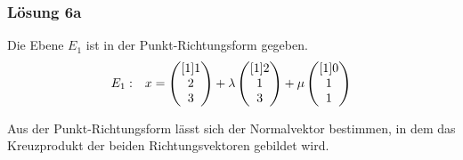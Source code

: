 \subsubsection{Lösung 6a}

Die Ebene $\displaystyle E_{1}$ ist in der Punkt-Richtungsform gegeben. 
\begin{equation*}
	\begin{array}{ r l }
		E_{1} : & x=\begin{pmatrix}[1]
			1\\
			2\\
			3
		\end{pmatrix} +\lambda \begin{pmatrix}[1]
			2\\
			1\\
			3
		\end{pmatrix} +\mu \begin{pmatrix}[1]
			0\\
			1\\
			1
		\end{pmatrix}
	\end{array}
\end{equation*}

Aus der Punkt-Richtungsform lässt sich der Normalvektor bestimmen, in dem das Kreuzprodukt der beiden Richtungsvektoren gebildet wird.

